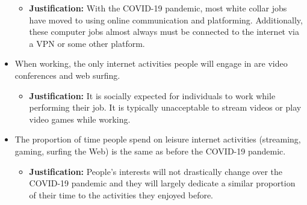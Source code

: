 \documentclass[12pt]{article}
\begin{document}
\begin{itemize}
    \begin{itemize}
        \item \textbf{Justification:} With the COVID-19 pandemic, most white collar jobs have moved to using online communication and platforming. Additionally, these computer jobs almost always must be connected to the internet via a VPN or some other platform.
    \end{itemize}
    \item When working, the only internet activities people will engage in are video conferences and web surfing.
    \begin{itemize}
        \item \textbf{Justification:} It is socially expected for individuals to work while performing their job. It is typically unacceptable to stream videos or play video games while working.
    \end{itemize}
    \item The proportion of time people spend on leisure internet activities (streaming, gaming, surfing the Web) is the same as before the COVID-19 pandemic.
    \begin{itemize}
        \item \textbf{Justification:} People's interests will not drastically change over the COVID-19 pandemic and they will largely dedicate a similar proportion of their time to the activities they enjoyed before.
    \end{itemize}
    
\end{itemize}
\end{document}
